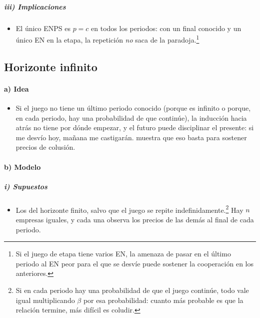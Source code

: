 \documentclass[11pt]{article}
\begin{document}
\subparagraph{iii) Implicaciones}

\begin{itemize}
\item El único ENPS es $p=c$ en todos los periodos: con un final conocido y un único EN en la etapa, la repetición \emph{no} saca de la paradoja.\footnote{Si el juego de etapa tiene varios EN, la amenaza de pasar en el último periodo al EN peor para el que se desvíe puede sostener la cooperación en los anteriores\nocite{BenoitKrishna1985Finitely}.}
\end{itemize}

\subsection{Horizonte infinito}\label{sec:horizonte-infinito}

\paragraph{a) Idea}

\begin{itemize}
\item Si el juego no tiene un último periodo conocido (porque es infinito o porque, en cada periodo, hay una probabilidad de que continúe), la inducción hacia atrás no tiene por dónde empezar, y el futuro puede disciplinar el presente: si me desvío hoy, mañana me castigarán. \textcite{Friedman1971Supergames} muestra que eso basta para sostener precios de colusión.
\end{itemize}

\paragraph{b) Modelo}

\subparagraph{i) Supuestos}

\begin{itemize}
\item Los del horizonte finito, salvo que el juego se repite indefinidamente.\footnote{Si en cada periodo hay una probabilidad de que el juego continúe, todo vale igual multiplicando $\beta$ por esa probabilidad: cuanto más probable es que la relación termine, más difícil es coludir.} Hay $n$ empresas iguales, y cada una observa los precios de las demás al final de cada periodo.
\end{itemize}
\end{document}
